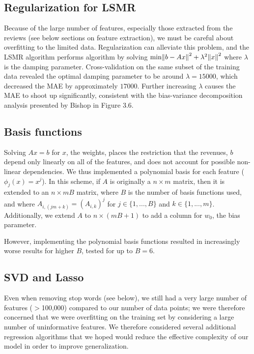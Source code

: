 \documentclass[11pt]{amsart}
\begin{document}
\subsection{Regularization for LSMR}
Because of the large number of features, especially those extracted from the reviews (see below sections on feature extraction), we must be careful about overfitting to the limited data. Regularization can alleviate this problem, and the LSMR algorithm performs algorithm by solving $\text{min}\norm{b-Ax}^2+\lambda^2\norm{x}^2$ where $\lambda$ is the damping parameter. Cross-validation on the same subset of the training data revealed the optimal damping parameter to be around $\lambda=15000$, which decreased the MAE by approximately $17000$. Further increasing $\lambda$ causes the MAE to shoot up significantly, consistent with the bias-variance decomposition analysis presented by Bishop in Figure 3.6.

\subsection{Basis functions}
Solving $Ax=b$ for $x$, the weights, places the restriction that the revenues, $b$ depend only linearly on all of the features, and does not account for possible non-linear dependencies. We thus implemented a polynomial basis for each feature ($\phi_j(x)=x^j$). In this scheme, if $A$ is originally a $n\times m$ matrix, then it is extended to an $n \times mB$ matrix, where $B$ is the number of basis functions used, and where $A_{i,(jm+k)}=(A_{i,k})^j$ for $j\in\{1,...,B\}$ and $k\in\{1,...,m\}$. Additionally, we extend $A$ to $n\times (mB+1)$ to add a column for $w_0$, the bias parameter.

However, implementing the polynomial basis functions resulted in increasingly worse results for higher $B$, tested for up to $B=6$.

\subsection{SVD and Lasso}

Even when removing stop words (see below), we still had a very large number of features ($>$100,000) compared to our number of data points; we were therefore concerned that we were overfitting on the training set by considering a large number of uninformative features.  We therefore considered several additional regression algorithms that we hoped would reduce the effective complexity of our model in order to improve generalization. 
\end{document}
